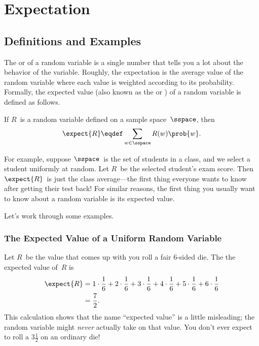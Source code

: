 \chapter{Expectation}\label{chap:expectation}

\begin{problems}
\classproblems
{}

\end{problems}

\section{Definitions and Examples}

The  or  of a random variable
is a single number that tells you a lot about the behavior of the
variable.  Roughly, the expectation is the average value of the random
variable where each value is weighted according to its probability.
Formally, the expected value (also known as the  or
) of a random variable is defined as follows.

\begin{definition}\label{def:expectation}
If $R$~is a random variable defined on a sample space~$\sspace$, then
\begin{equation}\label{eqn:expectation}
    \expect{R} \eqdef \sum_{w \in \sspace} R(w) \prob{w}.
\end{equation}
\end{definition}

For example, suppose $\sspace$~is the set of students in a class, and
we select a student uniformly at random.  Let $R$~be the selected
student's exam score.  Then $\expect{R}$~is just the class
average---the first thing everyone wants to know after getting their
test back!  For similar reasons, the first thing you usually want to
know about a random variable is its expected value.

Let's work through some examples.

\subsection{The Expected Value of a Uniform Random Variable}

Let $R$~be the value that comes up with you roll a fair 6-sided die.
The the expected value of~$R$ is
\begin{align*}
\expect{R}
    & = 1 \cdot \frac{1}{6} + 2 \cdot \frac{1}{6} + 3 \cdot \frac{1}{6} +
        4 \cdot \frac{1}{6} + 5 \cdot \frac{1}{6} + 6 \cdot \frac{1}{6} \\
    & = \frac{7}{2}.
\end{align*}
%
This calculation shows that the name ``expected value'' is a little
misleading; the random variable might \emph{never} actually take on that
value.  You don't ever expect to roll a $3 \frac{1}{2}$ on an ordinary
die!

